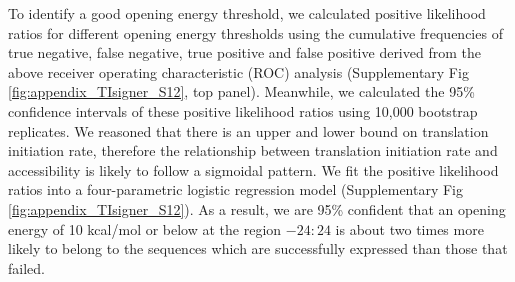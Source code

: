 To identify a good opening energy threshold, we calculated positive likelihood ratios for different opening energy thresholds using the cumulative frequencies of true negative, false negative, true positive and false positive derived from the above receiver operating characteristic (ROC) analysis (Supplementary Fig \ref{fig:appendix_TIsigner_S12}, top panel). Meanwhile, we calculated the 95\% confidence intervals of these positive likelihood ratios using 10,000 bootstrap replicates. We reasoned that there is an upper and lower bound on translation initiation rate, therefore the relationship between translation initiation rate and accessibility is likely to follow a sigmoidal pattern. We fit the positive likelihood ratios into a four-parametric logistic regression model (Supplementary Fig \ref{fig:appendix_TIsigner_S12}). As a result, we are 95\% confident that an opening energy of 10 kcal/mol or below at the region $−24:24$ is about two times more likely to belong to the sequences which are successfully expressed than those that failed.

